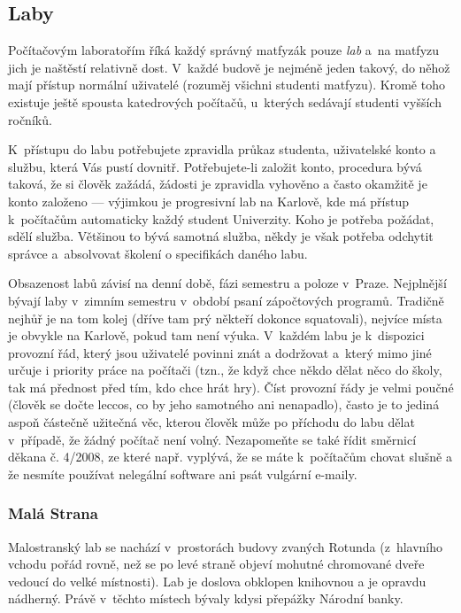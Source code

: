 \subsection{Laby}

Počítačovým laboratořím říká každý správný matfyzák pouze {\it lab\/}
a~na matfyzu jich je naštěstí relativně dost. V~každé budově je
nejméně jeden takový, do něhož mají přístup normální uživatelé
(rozuměj všichni studenti matfyzu). Kromě toho existuje ještě
spousta katedrových počítačů, u~kterých sedávají studenti vyšších
ročníků.

K~přístupu do labu potřebujete zpravidla průkaz studenta,
uživatelské konto a službu, která Vás pustí dovnitř.
Po\-tře\-bu\-jete-li založit konto, procedura bývá taková, že si
člověk zažádá, žádosti je zpravidla vyhověno a často okamžitě je
konto založeno --- výjimkou je progresivní lab na Karlově, kde má přístup k~počítačům automaticky každý student Univerzity. Koho je potřeba požádat, sdělí služba. Většinou to
bývá samotná služba, někdy je však potřeba odchytit správce
a~absolvovat školení o specifikách daného labu.

Obsazenost labů závisí na denní době, fázi semestru a poloze
v~Praze. Nejplnější bývají laby v~zimním semestru v~období psaní
zápočtových programů.  Tradičně nejhůř je na tom kolej (dříve tam
prý někteří dokonce squatovali), nejvíce místa je obvykle na
Karlově, pokud tam není výuka. V~každém labu je k~dispozici
provozní řád, který jsou uživatelé povinni znát a dodržovat
a~který mimo jiné určuje i priority práce na počítači (tzn., že
když chce někdo dělat něco do školy, tak má přednost před tím, kdo
chce hrát hry). Číst provozní řády je velmi
poučné (člověk se dočte leccos, co by jeho samotného ani
nenapadlo), často je to jediná aspoň částečně užitečná věc, kterou
člověk může po příchodu do labu dělat v~případě, že žádný počítač
není volný.  Nezapomeňte se také řídit směrnicí děkana č. 4/2008,
ze které např. vyplývá, že se máte k~počítačům chovat slušně a že
nesmíte používat nelegální software ani psát vulgární e-maily.

\subsubsection{Malá Strana}

Malostranský lab se nachází v~prostorách budovy zvaných Rotunda
(z~hlavního vchodu pořád rovně, než se po levé straně objeví mohutné
chromované dveře vedoucí do velké místnosti). Lab je doslova
obklopen knihovnou a je opravdu nádherný. Právě v~těchto místech
bývaly kdysi přepážky Národní banky.

